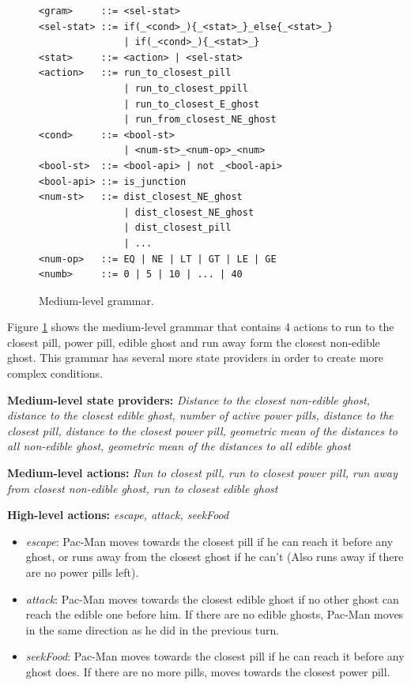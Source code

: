 \documentclass{llncs}
\newcommand{\paco}{Pac-Man }
\begin{document}
\begin{figure}[tb]
	\centering
\begin{lstlisting}[frame=single, breaklines=false, basicstyle=\fontsize{10}{11}\ttfamily]
<gram>     ::= <sel-stat>
<sel-stat> ::= if(_<cond>_){_<stat>_}_else{_<stat>_}
               | if(_<cond>_){_<stat>_}
<stat>     ::= <action> | <sel-stat>
<action>   ::= run_to_closest_pill 
               | run_to_closest_ppill 
               | run_to_closest_E_ghost 
               | run_from_closest_NE_ghost
<cond>     ::= <bool-st>  
               | <num-st>_<num-op>_<num> 
<bool-st>  ::= <bool-api> | not _<bool-api>
<bool-api> ::= is_junction
<num-st>   ::= dist_closest_NE_ghost
               | dist_closest_NE_ghost 
               | dist_closest_pill
               | ...
<num-op>   ::= EQ | NE | LT | GT | LE | GE
<numb>     ::= 0 | 5 | 10 | ... | 40
\end{lstlisting} %
	\caption{Medium-level grammar.}
	\label{fig:ml-grammar}
\end{figure}

Figure \ref{fig:ml-grammar} shows the medium-level grammar that contains 4 actions to run to the closest pill, power pill, edible ghost and run away form the closest non-edible ghost. This grammar has several more state providers in order to create more complex conditions.

\textbf{Medium-level state providers:}
\textit{Distance to the closest non-edible ghost, distance to the closest edible ghost, number of active power pills, distance to the closest pill, distance to the closest power pill, geometric mean of the distances to all non-edible ghost, geometric mean of the distances to all edible ghost}

\textbf{Medium-level actions:}
\textit{Run to closest pill, run to closest power pill, run away from closest non-edible ghost, run to closest edible ghost}

\textbf{High-level actions:}
\textit{escape, attack, seekFood}
\begin{itemize}
\addtolength{\itemindent}{1cm}
\item \textit{escape}: \paco moves towards the closest pill if he can reach it before any ghost, or runs away from the closest ghost if he can't (Also runs away if there are no power pills left).
\item \textit{attack}: \paco moves towards the closest edible ghost if no other ghost can reach the edible one before him. If there are no edible ghosts, \paco moves in the same direction as he did in the previous turn.
\item \textit{seekFood}: \paco moves towards the closest pill if he can reach it before any ghost does. If there are no more pills, moves towards the closest power pill.
\end{itemize}
\end{document}
